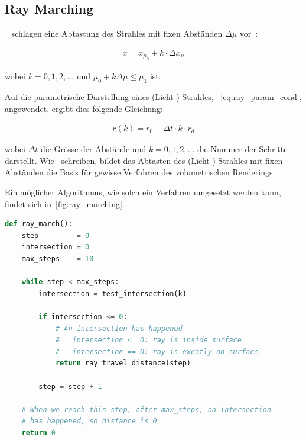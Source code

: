 \subsection{Ray Marching}
\label{subsec:ray_marching}

~\citeauthor{perlin_hypertexture_1989} schlagen eine Abtastung des
Strahles mit fixen Abständen $\Delta \mu$ vor~\parencite[S.
259]{perlin_hypertexture_1989}:

\begin{gather}
    x = x_{\mu_{0}} + k \cdot \Delta x_{\mu}
\end{gather}

wobei $k = 0,1,2,\dots$ und $\mu_{0} + k \Delta \mu \leq \mu_{1}$ ist.

Auf die parametrische Darstellung eines (Licht-) Strahles,
~\autoref{eq:ray_param_cond}, angewendet, ergibt dies folgende Gleichung:

\begin{gather}
    r(k) = r_{0} + \Delta t \cdot k \cdot r_{d}
\end{gather}

wobei $\Delta t$ die Grösse der Abstände und $k = 0,1,2,\dots$ die Nummer der
Schritte darstellt. Wie~\citeauthor{hart_ray_1989} schreiben, bildet das Abtasten des
(Licht-) Strahles mit fixen Abständen die Basis für gewisse Verfahren des
volumetrischen Renderings~\parencite[S. 291]{hart_ray_1989}.

Ein möglicher Algorithmus, wie solch ein Verfahren umgesetzt werden kann,
findet sich in~\autoref{fig:ray_marching}.

\begin{lstlisting}[language=Python,caption={Eine abstrakte Umsetzung des Ray
        Marchings\protect\footnotemark.},label={fig:ray_marching},captionpos=b,emph={ray_march}]
def ray_march():
    step         = 0
    intersection = 0
    max_steps    = 10

    while step < max_steps:
        intersection = test_intersection(k)

        if intersection <= 0:
            # An intersection has happened
            #   intersection <  0: ray is inside surface
            #   intersection == 0: ray is excatly on surface
            return ray_travel_distance(step)

        step = step + 1

    # When we reach this step, after max_steps, no intersection
    # has happened, so distance is 0
    return 0
\end{lstlisting}

